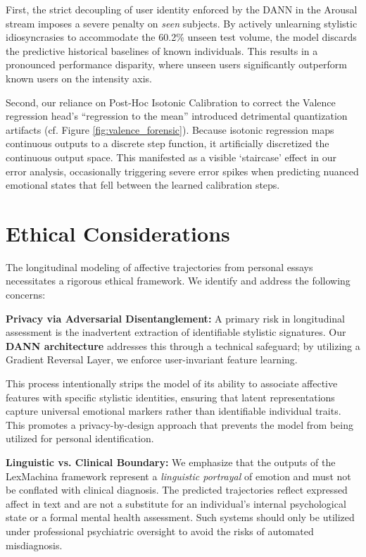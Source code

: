 \documentclass[11pt, a4paper]{article}
\begin{document}
First, the strict decoupling of user identity enforced by the DANN in the Arousal stream imposes a severe penalty on \textit{seen} subjects. By actively unlearning stylistic idiosyncrasies to accommodate the 60.2\% unseen test volume, the model discards the predictive historical baselines of known individuals. This results in a pronounced performance disparity, where unseen users significantly outperform known users on the intensity axis.

Second, our reliance on Post-Hoc Isotonic Calibration to correct the Valence regression head's ``regression to the mean'' introduced detrimental quantization artifacts (cf. Figure \ref{fig:valence_forensic}). Because isotonic regression maps continuous outputs to a discrete step function, it artificially discretized the continuous output space. This manifested as a visible `staircase' effect in our error analysis, occasionally triggering severe error spikes when predicting nuanced emotional states that fell between the learned calibration steps.

\section{Ethical Considerations}
\label{sec:ethics}
The longitudinal modeling of affective trajectories from personal essays necessitates a rigorous ethical framework. We identify and address the following concerns:

\textbf{Privacy via Adversarial Disentanglement:} A primary risk in longitudinal assessment is the inadvertent extraction of identifiable stylistic signatures. Our \textbf{DANN architecture} addresses this through a technical safeguard; by utilizing a Gradient Reversal Layer, we enforce user-invariant feature learning. 

This process intentionally strips the model of its ability to associate affective features with specific stylistic identities, ensuring that latent representations capture universal emotional markers rather than identifiable individual traits. This promotes a privacy-by-design approach that prevents the model from being utilized for personal identification.

\textbf{Linguistic vs. Clinical Boundary:} We emphasize that the outputs of the LexMachina framework represent a \textit{linguistic portrayal} of emotion and must not be conflated with clinical diagnosis. The predicted trajectories reflect expressed affect in text and are not a substitute for an individual's internal psychological state or a formal mental health assessment. Such systems should only be utilized under professional psychiatric oversight to avoid the risks of automated misdiagnosis.
\end{document}

